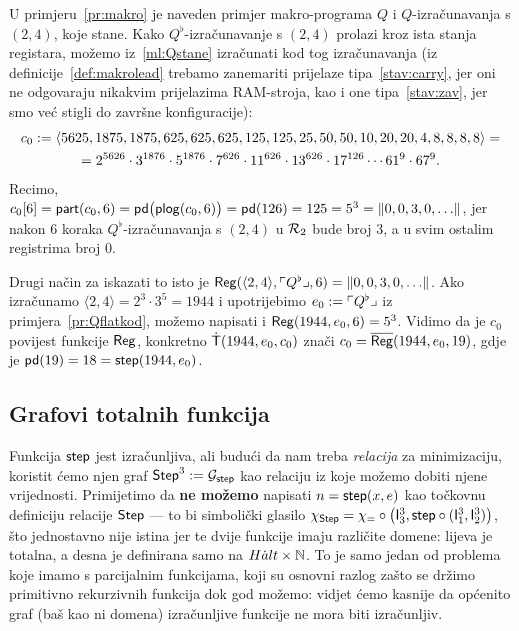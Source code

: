 \begin{primjer}
U primjeru~\ref{pr:makro} je naveden primjer makro-programa $Q$ i $Q$-izračunavanja s $(2,4)$, koje stane. Kako $Q^\flat$-izračunavanje s $(2,4)$ prolazi kroz ista stanja registara, možemo iz~\eqref{ml:Qstane} izračunati kod tog izračunavanja (iz definicije~\ref{def:makrolead} trebamo zanemariti prijelaze tipa~\ref{stav:carry}, jer oni ne odgovaraju nikakvim prijelazima RAM-stroja, kao i one tipa~\ref{stav:zav}, jer smo već stigli do završne konfiguracije):
\begin{multline}
    c_0:=\langle5625,1875,1875,625,625,625,125,125,25,50,50,10,20,20,4,8,8,8,8\rangle=\\
    =2^{5626}\cdot3^{1876}\cdot5^{1876}\cdot7^{626}\cdot11^{626}\cdot13^{626}\cdot17^{126}\dotsm61^9\cdot67^9\text.
\end{multline}
Recimo, $c_0[6]=\mathsf{part}(c_0,6)=\mathsf{pd}\bigl(\mathsf{plog}(c_0,6)\bigr)=\mathsf{pd}(126)=125=5^3=\lVert0,0,3,0,\dotsc\rVert$, jer nakon $6$ koraka $Q^\flat$-izračunavanja s $(2,4)$ u $\mathcal R_{2}$ bude broj $3$, a u svim ostalim registrima broj $0$.

Drugi način za iskazati to isto je $\mathsf{Reg}(\langle2,4\rangle,\ulcorner Q^\flat\lrcorner,6)=\lVert0,0,3,0,\dotsc\rVert$. Ako iz\-ra\-ču\-na\-mo $\langle2,4\rangle=2^3\cdot3^5=1944$ i upotrijebimo $e_0:=\ulcorner Q^\flat\lrcorner$ iz primjera~\ref{pr:Qflatkod}, možemo napisati i $\mathsf{Reg}(1944,e_0,6)=5^3$. Vidimo da je $c_0$ povijest funkcije $\mathsf{Reg}$, konkretno $\mathsf{\dot T}(1944,e_0,c_0)$ znači $c_0=\overline{\mathsf{Reg}}(1944,e_0,19)$, gdje je $\mathsf{pd}(19)=18=\mathsf{step}(1944,e_0)$.
\end{primjer}

\subsection{Grafovi totalnih funkcija}

Funkcija $\mathsf{step}$ jest izračunljiva, ali budući da nam treba \emph{relacija} za minimizaciju, koristit ćemo njen graf $\mathsf{Step}^3:=\mathcal G_{\mathsf{step}}$ kao relaciju iz koje možemo dobiti njene vrijednosti. Primijetimo da \textbf{ne možemo} napisati $n=\mathsf{step}(x,e)$ kao točkovnu definiciju relacije $\mathsf{Step}$ --- to bi simbolički glasilo $\chi_{\mathsf{Step}}=\chi_=\circ\bigl(\mathsf I_3^3,\mathsf{step}\circ(\mathsf I_1^3,\mathsf I_2^3)\bigr)$, što jednostavno nije istina jer te dvije funkcije imaju različite domene: lijeva je totalna, a desna je definirana samo na $H\dot alt\times{\mathbb N}$. To je samo jedan od problema koje imamo s parcijalnim funkcijama, koji su osnovni razlog zašto se držimo primitivno rekurzivnih funkcija dok god možemo: vidjet ćemo kasnije da općenito graf (baš kao ni domena) izračunljive funkcije ne mora biti izračunljiv.


